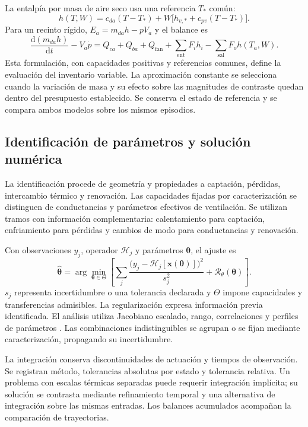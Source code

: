 La entalpía por masa de aire seco usa una referencia $T_*$ común:
\begin{equation}
h(T,W)=c_{da}(T-T_*)+W\bigl[h_{v,*}+c_{pv}(T-T_*)\bigr].
\label{met:entalpia_aire}
\end{equation}
Para un recinto rígido, $E_a=m_{da}h-pV_a$ y el balance es
\begin{equation}
\frac{\mathrm d(m_{da}h)}{\mathrm dt}-V_a\dot p
=Q_{ca}+Q_{ba}+Q_{\mathrm{fan}}
+\sum_{\mathrm{ent}}F_ih_i-\sum_{\mathrm{sal}}F_oh(T_a,W).
\label{met:red_energia_variable}
\end{equation}
Esta formulación, con capacidades positivas y referencias comunes, define la evaluación del inventario variable. La aproximación constante se selecciona cuando la variación de masa y su efecto sobre las magnitudes de contraste quedan dentro del presupuesto establecido. Se conserva el estado de referencia y se compara ambos modelos sobre los mismos episodios.

\subsection{Identificación de parámetros y solución numérica}
\label{met:identificacion}

La identificación procede de geometría y propiedades a captación, pérdidas, intercambio térmico y renovación. Las capacidades fijadas por caracterización se distinguen de conductancias y parámetros efectivos de ventilación. Se utilizan tramos con información complementaria: calentamiento para captación, enfriamiento para pérdidas y cambios de modo para conductancias y renovación.

Con observaciones $y_j$, operador $\mathcal H_j$ y parámetros $\boldsymbol\theta$, el ajuste es
\begin{equation}
\widehat{\boldsymbol\theta}=\arg\min_{\boldsymbol\theta\in\Theta}
\left[\sum_j\frac{\bigl(y_j-\mathcal H_j[\mathbf x(\boldsymbol\theta)]\bigr)^2}{s_j^2}
+\mathcal R_\theta(\boldsymbol\theta)\right].
\label{met:ajuste_fisico}
\end{equation}
$s_j$ representa incertidumbre o una tolerancia declarada y $\Theta$ impone capacidades y transferencias admisibles. La regularización expresa información previa identificada. El análisis utiliza Jacobiano escalado, rango, correlaciones y perfiles de parámetros \cite{ljung1999}. Las combinaciones indistinguibles se agrupan o se fijan mediante caracterización, propagando su incertidumbre.

La integración conserva discontinuidades de actuación y tiempos de observación. Se registran método, tolerancias absolutas por estado y tolerancia relativa. Un problema con escalas térmicas separadas puede requerir integración implícita; su solución se contrasta mediante refinamiento temporal y una alternativa de integración sobre las mismas entradas. Los balances acumulados acompañan la comparación de trayectorias.

